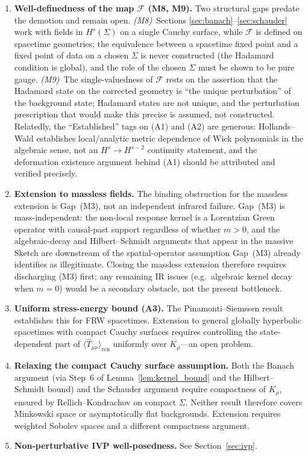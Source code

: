 \documentclass[12pt,a4paper]{article}
\begin{document}
\begin{enumerate}
\item \textbf{Well-definedness of the map $\mathcal{F}$ (M8, M9).}
Two structural gaps predate the demotion and remain open. \emph{(M8)}~Sections
\ref{sec:banach}--\ref{sec:schauder} work with fields in $H^s(\Sigma)$ on a single Cauchy
surface, while $\mathcal{F}$ is defined on spacetime geometries; the equivalence between
a spacetime fixed point and a fixed point of data on a chosen $\Sigma$ is never
constructed (the Hadamard condition is global), and the role of the chosen $\Sigma$ must
be shown to be pure gauge. \emph{(M9)}~The single-valuedness of $\mathcal{F}$ rests on
the assertion that the Hadamard state on the corrected geometry is ``the unique
perturbation'' of the background state; Hadamard states are not unique, and the
perturbation prescription that would make this precise is assumed, not constructed.
Relatedly, the ``Established'' tags on (A1) and (A2) are generous: Hollands--Wald
\cite{hollands_wald_wick} establishes local/analytic metric dependence of Wick
polynomials in the algebraic sense, not an $H^s \to H^{s-2}$ continuity statement, and
the deformation existence argument behind (A1) should be attributed and verified
precisely.

\item \textbf{Extension to massless fields.}
The binding obstruction for the massless extension is Gap~(M3), not an
independent infrared failure. Gap~(M3) is mass-independent: the non-local
response kernel is a Lorentzian Green operator with causal-past support
regardless of whether $m > 0$, and the algebraic-decay and Hilbert--Schmidt
arguments that appear in the massive Sketch are downstream of the spatial-operator
assumption Gap~(M3) already identifies as illegitimate. Closing the massless
extension therefore requires discharging (M3) first; any remaining IR issues
(e.g.\ algebraic kernel decay when $m = 0$) would be a secondary obstacle, not
the present bottleneck.

\item \textbf{Uniform stress-energy bound (A3).} The Pinamonti--Siemssen
result~\cite{pinamonti_siemssen} establishes this for FRW spacetimes. Extension to general
globally hyperbolic spacetimes with compact Cauchy surfaces requires controlling the
state-dependent part of $\langle\hat{T}_{\mu\nu}\rangle_{\text{ren}}$ uniformly over
$K_\rho$---an open problem.

\item \textbf{Relaxing the compact Cauchy surface assumption.} Both the Banach argument
(via Step~6 of Lemma~\ref{lem:kernel_bound} and the Hilbert--Schmidt bound) and the
Schauder argument require compactness of $K_\rho$, ensured by Rellich--Kondrachov on
compact $\Sigma$. Neither result therefore covers Minkowski space or asymptotically flat
backgrounds. Extension requires weighted Sobolev spaces and a different compactness
argument.

\item \textbf{Non-perturbative IVP well-posedness.} See Section~\ref{sec:ivp}.

\end{enumerate}
\end{document}
